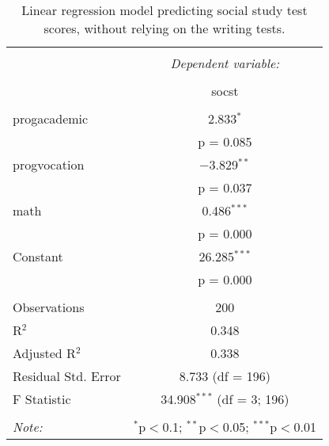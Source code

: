 
\begin{table}[!htbp] \centering 
  \caption{Linear regression model predicting social study test scores, 
          without relying on the writing tests.} 
  \label{tab::lm_socst_nopeeking} 
\begin{tabular}{@{\extracolsep{5pt}}lc} 
\\[-1.8ex]\hline 
\hline \\[-1.8ex] 
 & \multicolumn{1}{c}{\textit{Dependent variable:}} \\ 
\cline{2-2} 
\\[-1.8ex] & socst \\ 
\hline \\[-1.8ex] 
 progacademic & 2.833$^{*}$ \\ 
  & p = 0.085 \\ 
  progvocation & $-$3.829$^{**}$ \\ 
  & p = 0.037 \\ 
  math & 0.486$^{***}$ \\ 
  & p = 0.000 \\ 
  Constant & 26.285$^{***}$ \\ 
  & p = 0.000 \\ 
 \hline \\[-1.8ex] 
Observations & 200 \\ 
R$^{2}$ & 0.348 \\ 
Adjusted R$^{2}$ & 0.338 \\ 
Residual Std. Error & 8.733 (df = 196) \\ 
F Statistic & 34.908$^{***}$ (df = 3; 196) \\ 
\hline 
\hline \\[-1.8ex] 
\textit{Note:}  & \multicolumn{1}{r}{$^{*}$p$<$0.1; $^{**}$p$<$0.05; $^{***}$p$<$0.01} \\ 
\end{tabular} 
\end{table} 
